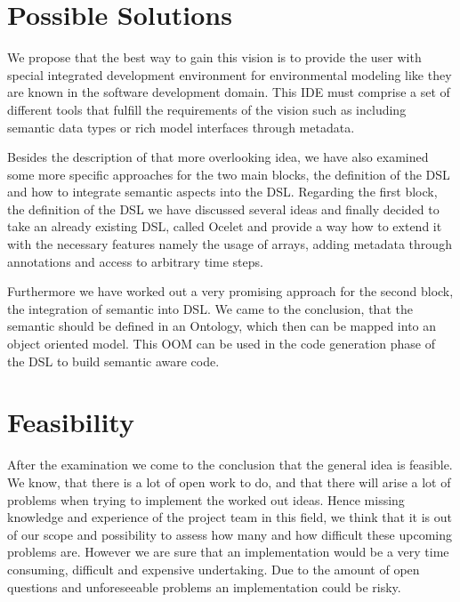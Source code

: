 \section*{Possible Solutions}
\par
We propose that the best way to gain this vision is to provide the user with special integrated development environment for environmental modeling like they are known in the software development domain. This IDE must comprise a set of different tools that fulfill the requirements of the vision such as including semantic data types or rich model interfaces through metadata.
\par
Besides the description of that more overlooking idea, we have also examined some more specific approaches for the two main blocks, the definition of the DSL and how to integrate semantic aspects into the DSL. Regarding the first block, the definition of the DSL we have discussed several ideas and finally decided to take an already existing DSL, called Ocelet and provide a way how to extend it with the necessary features namely the usage of arrays, adding metadata through annotations and access to arbitrary time steps.
\par
Furthermore we have worked out a very promising approach for the second block, the integration of semantic into DSL. We came to the conclusion, that the semantic should be defined in an Ontology, which then can be mapped into an object oriented model. This OOM can be used in the code generation phase of the DSL to build semantic aware code.

\section*{Feasibility}
\par
After the examination we come to the conclusion that the general idea is feasible. We know, that there is a lot of open work to do, and that there will arise a lot of problems when trying to implement the worked out ideas. Hence missing knowledge and experience of the project team in this field, we think that it is out of our scope and possibility to assess how many and how difficult these upcoming problems are. However we are sure that an implementation would be a very time consuming, difficult and expensive undertaking. Due to the amount of open questions and unforeseeable problems an implementation could be risky. 







